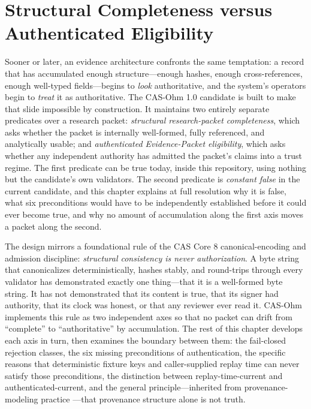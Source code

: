 \chapter{Structural Completeness versus Authenticated Eligibility}\label{elig:chapter}

Sooner or later, an evidence architecture confronts the same temptation: a record that has accumulated enough structure---enough hashes, enough cross-references, enough well-typed fields---begins to \emph{look} authoritative, and the system's operators begin to \emph{treat} it as authoritative. The CAS-Ohm 1.0 candidate is built to make that slide impossible by construction. It maintains two entirely separate predicates over a research packet: \emph{structural research-packet completeness}, which asks whether the packet is internally well-formed, fully referenced, and analytically usable; and \emph{authenticated Evidence-Packet eligibility}, which asks whether any independent authority has admitted the packet's claims into a trust regime. The first predicate can be true today, inside this repository, using nothing but the candidate's own validators. The second predicate is \emph{constant false} in the current candidate, and this chapter explains at full resolution why it is false, what six preconditions would have to be independently established before it could ever become true, and why no amount of accumulation along the first axis moves a packet along the second.

The design mirrors a foundational rule of the CAS Core 8 canonical-encoding and admission discipline: \emph{structural consistency is never authorization}. A byte string that canonicalizes deterministically, hashes stably, and round-trips through every validator has demonstrated exactly one thing---that it is a well-formed byte string. It has not demonstrated that its content is true, that its signer had authority, that its clock was honest, or that any reviewer ever read it. CAS-Ohm implements this rule as two independent axes so that no packet can drift from ``complete'' to ``authoritative'' by accumulation. The rest of this chapter develops each axis in turn, then examines the boundary between them: the fail-closed rejection classes, the six missing preconditions of authentication, the specific reasons that deterministic fixture keys and caller-supplied replay time can never satisfy those preconditions, the distinction between replay-time-current and authenticated-current, and the general principle---inherited from provenance-modeling practice \cite{prov}---that provenance structure alone is not truth.

